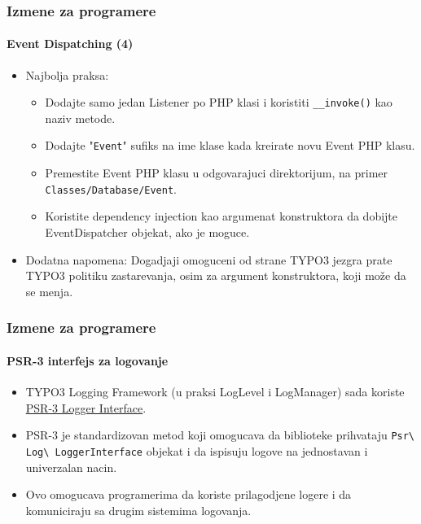 
\begin{frame}[fragile]
	\frametitle{Izmene za programere}
	\framesubtitle{Event Dispatching (4)}

	\lstset{basicstyle=\tiny\ttfamily}

	\begin{itemize}
		\item Najbolja praksa:

			\begin{itemize}
				\item Dodajte samo jedan Listener po PHP klasi i koristiti \texttt{\_\_invoke()} kao naziv metode.
				\item Dodajte "\texttt{Event}" sufiks na ime klase kada kreirate novu Event PHP klasu.
				\item Premestite Event PHP klasu u odgovarajuci direktorijum, na primer \texttt{Classes/Database/Event}.
				\item Koristite dependency injection kao argumenat konstruktora da dobijte EventDispatcher objekat, ako je moguce.
			\end{itemize}

		\item Dodatna napomena:\newline
			\small
				Dogadjaji omoguceni od strane TYPO3 jezgra prate TYPO3 politiku zastarevanja, osim za argument konstruktora, koji može da se menja.

			\normalsize

	\end{itemize}

\end{frame}


\begin{frame}[fragile]
	\frametitle{Izmene za programere}
	\framesubtitle{PSR-3 interfejs za logovanje}

	\begin{itemize}
		\item TYPO3 Logging Framework (u praksi LogLevel i LogManager) sada koriste
			\href{https://www.php-fig.org/psr/psr-3/}{PSR-3 Logger Interface}.

		\item PSR-3 je standardizovan metod koji omogucava da biblioteke prihvataju
			\texttt{Psr\textbackslash
				Log\textbackslash
				LoggerInterface} objekat i da ispisuju logove na jednostavan i univerzalan nacin.

			\item Ovo omogucava programerima da koriste prilagodjene logere i da komuniciraju
				sa drugim sistemima logovanja.

	\end{itemize}

\end{frame}

